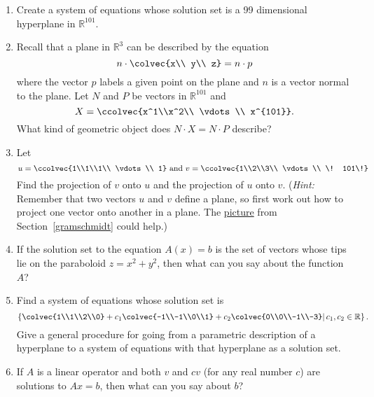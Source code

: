 \begin{enumerate}
\item Create a system of equations whose solution set is a 99 dimensional hyperplane in 
$\mathbb{R}^{101}$. 

\item Recall that a plane in $\mathbb{R}^3$ can be described by the equation 
\[n \cdot \colvec{x\\ y\\ z}=n\cdot p\] 
where the vector $p$ labels a given point on the plane and $n$ is a vector normal to the plane. 
Let  $N$ and $P$ be vectors in $\mathbb{R}^{101}$ and 
\[X=\ccolvec{x^1\\x^2\\ \vdots\\ x^{101}}.\]
What kind of geometric object does $N\cdot X= N\cdot P$ describe?

\item 
Let
\[
u=\ccolvec{1\\1\\1\\ \vdots \\ 1} \text{~and~} v= \ccolvec{1\\2\\3\\ \vdots\\ \! 101\!} 
\]
Find the projection of $v$ onto $u$ and the projection of $u$ onto $v$.
({\itshape Hint:} Remember that  two vectors $u$ and $v$ define a plane, so first work out how to project one vector onto another
in a plane. The \hyperlink{projectionpic}{picture} from Section~\ref{gramschmidt} could help.)

\item If the solution set to the equation $A(x)=b$ is the set of vectors whose tips lie on the paraboloid $z=x^2+y^2$, then what can you say about the function $A$? 


\item Find a system of equations whose solution set is 
\[
\left\{ \colvec{1\\1\\2\\0} +c_1 \colvec{-1\\-1\\0\\1} +c_2 \colvec{0\\0\\-1\\-3}  \middle| \,c_1,c_2\in \mathbb{R} 
\right\}.
\]
Give a general procedure for going from a parametric description of a hyperplane to a system of equations with  that hyperplane as a solution set.


\item If $A$ is a linear operator and both  $v$ and $cv$ (for any real number $c$) are  solutions to $Ax=b$, then what can you say about $b$? 


\end{enumerate}

